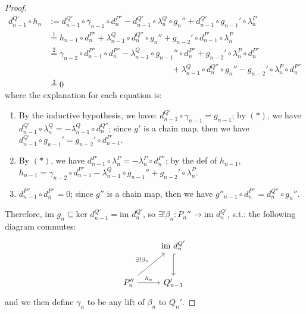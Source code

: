 \begin{proof}
\begin{align*}
        d_{n-1}^{Q'} \circ h_n&:= d_{n-1}^{Q'} \circ \gamma_{n-1} \circ d_n^{P''}- d_{n-1}^{Q'} \circ \lambda^Q_n \circ g_n''+ d_{n-1}^{Q'} \circ g_{n-1}'\circ \lambda^P_n\\
        &\overset{1}{=} h_{n-1} \circ d_n^{P''} + \lambda_{n-1}^{Q} \circ d_n^{Q''} \circ g_n'' +g_{n-2}' \circ d_{n-1}^{P'} \circ \lambda_n^P\\
        &\overset{2}{=} \gamma_{n-2} \circ d_{n-1}^{P''} \circ d_n^{P''}- \lambda_{n-1}^Q \circ g_{n-1}'' \circ d_n^{P''} +g_{n-2}' \circ \lambda_n^P \circ d_n^{P''} \\
        &\;\;\;\;\;\;\;\;\;\;\;\;\;\;\;\;\;\;\;\;\;\;\;\;\;\;\;\;\;\;\;\;\;\;\;\;\;\;\;\;\;\;\;\;\;\;\;\;\;\;\;\;\; +\lambda_{n-1}^Q \circ d_n^{Q''} \circ g_n'' - g_{n-2}' \circ \lambda_n^P \circ d_n^{P''}\\
        &\overset{3}{=}0
    \end{align*}
    where the explanation for each equation is:
    \begin{enumerate}
        \item By the inductive hypothesis, we have: $d_{n-1}^{Q'} \circ \gamma_{n-1}= g_{n-1}$; by $(*)$, we have $d_{n-1}^{Q'} \circ \lambda_n^Q= -\lambda_{n-1}^Q \circ d_n^{Q''}$; since $g'$ is a chain map, then we have $d_{n-1}^{Q'} \circ g_{n-1}' = g_{n-2}' \circ d_{n-1}^{P'}$.

        \item By $(*)$, we have $d_{n-1}^{P'} \circ \lambda_n^P= -\lambda_n^P \circ d_n^{P''}$; by the def of $h_{n-1}$, $h_{n-1}= \gamma_{n-2} \circ d_{n-1}^{P''}- \lambda_{n-1}^Q \circ g_{n-1}''+ g_{n-2}' \circ \lambda_n^P$.

        \item $d_{n-1}^{P''} \circ d_{n}^{P''}=0$; since $g''$ is a chain map, then we have $g''_{n-1} \circ d_n^{P''}= d_n^{Q''} \circ g_n''$.
    \end{enumerate}
    Therefore, $\text{im }g_n \subseteq \text{ker }d_{n-1}^{Q'}= \text{im }d_n^{Q'}$, so $\exists! \beta_n:P_n'' \to \text{im }d_n^{Q'}$, s.t.: the following diagram commutes:
    \[
    \begin{tikzcd}[row sep=large]
        &\text{im }d_n^{Q'} \arrow[d, hook]\\
        P_n'' \arrow[ru, "\exists !\beta_n"] \arrow[r, "h_n"]&Q_{n-1}'
    \end{tikzcd}
    \]
    and we then define $\gamma_n$ to be any lift of $\beta_n$ to $Q_n'$.
\end{proof}

